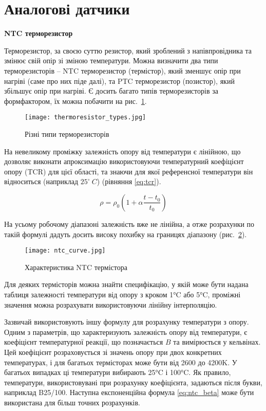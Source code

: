 \section{Аналогові датчики}

\textbf{NTC терморезистор}\bigskip

Терморезистор, за своєю суттю резистор, який зроблений з напівпровідника та змінює свій опір зі зміною температури. Можна визначити два типи терморезисторів -- NTC терморезистор (термістор), який зменшує опір при нагріві (саме про них піде далі), та PTC терморезистор (позистор), який збільшує опір при нагріві. Є досить багато типів терморезисторів за формфактором, їх можна побачити на рис.~\ref{fig:thermoresistor_types}.

\begin{figure}[ht]
    \centering
    \texttt{[image: thermoresistor\_types.jpg]}
    \caption{Різні типи терморезисторів}
    \label{fig:thermoresistor_types}
\end{figure}

На невеликому проміжку залежність опору від температури є лінійною, що дозволяє виконати апроксимацію використовуючи температурний коефіцієнт опору (TCR) для цієї області, та знаючи для якої референсної температури він відноситься (наприклад $25^\circ~C$) (рівняння \ref{eq:tcr}).

\begin{equation}
    \label{eq:tcr}
    \rho = \rho_0\left(1+\alpha\frac{t-t_0}{t_0}\right)
\end{equation}

На усьому робочому діапазоні залежність вже не лінійна, а отже розрахунки по такій формулі дадуть досить високу похибку на границях діапазону (рис.~\ref{fig:ntc_curve}).

\begin{figure}[ht]
    \centering
    \texttt{[image: ntc\_curve.jpg]}
    \caption{Характеристика NTC термістора}
    \label{fig:ntc_curve}
\end{figure}

Для деяких термісторів можна знайти специфікацію, у якій може бути надана таблиця залежності температури від опору з кроком 1°C або 5°C, проміжні значення можна розрахувати використовуючи лінійну інтерполяцію.

Зазвичай використовують іншу формулу для розрахунку температури з опору. Одним з параметрів, що характеризують залежність опору від температури, є коефіцієнт температурної реакції, що позначається $B$ та вимірюється у кельвінах. Цей коефіцієнт розраховується зі значень опору при двох конкретних температурах, і для багатьох термісторах може бути від 2600 до 4200K. У багатьох випадках ці температури вибирають 25°C і 100°C. Як правило, температури, використовувані при розрахунку коефіцієнта, задаються після букви, наприклад B25/100. Наступна експоненційна формула \ref{eq:ntc_beta} може бути використана для більш точних розрахунків.

